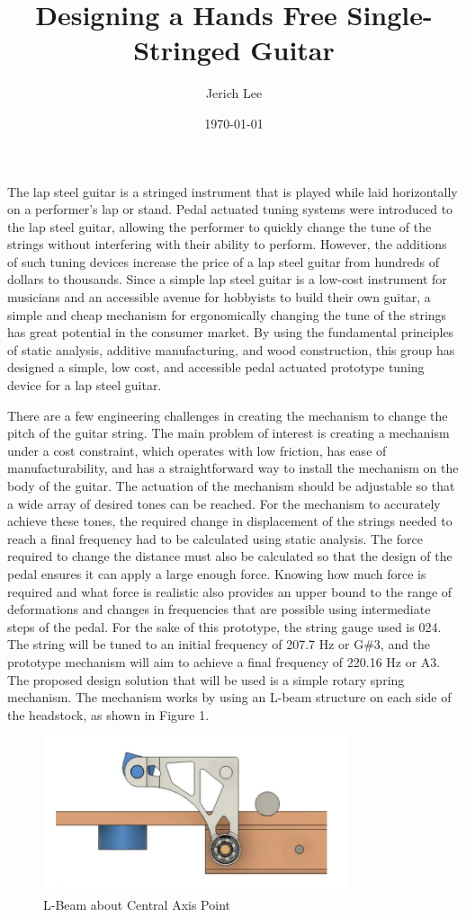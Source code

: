 \documentclass[12pt]{article}
\title{Designing a Hands Free Single-Stringed Guitar}
\author{Jerich Lee}
\date{\today}
\theoremstyle{definition} %
\theoremstyle{plain} %
\begin{document}
\maketitle
The lap steel guitar is a stringed instrument that is played while laid horizontally on a
performer’s lap or stand. Pedal actuated tuning systems were introduced to the lap steel guitar,
allowing the performer to quickly change the tune of the strings without interfering with their ability
to perform. However, the additions of such tuning devices increase the price of a lap steel guitar
from hundreds of dollars to thousands. Since a simple lap steel guitar is a low-cost instrument for
musicians and an accessible avenue for hobbyists to build their own guitar, a simple and cheap
mechanism for ergonomically changing the tune of the strings has great potential in the consumer
market. By using the fundamental principles of static analysis, additive manufacturing, and wood
construction, this group has designed a simple, low cost, and accessible pedal actuated prototype
tuning device for a lap steel guitar.

There are a few engineering challenges in creating the mechanism to change the pitch of the
guitar string. The main problem of interest is creating a mechanism under a cost constraint, which
operates with low friction, has ease of manufacturability, and has a straightforward way to install the
mechanism on the body of the guitar. The actuation of the mechanism should be adjustable so that a
wide array of desired tones can be reached. For the mechanism to accurately achieve these tones, the
required change in displacement of the strings needed to reach a final frequency had to be calculated
using static analysis. The force required to change the distance must also be calculated so that the
design of the pedal ensures it can apply a large enough force. Knowing how much force is required
and what force is realistic also provides an upper bound to the range of deformations and changes in
frequencies that are possible using intermediate steps of the pedal. For the sake of this prototype,
the string gauge used is 024. The string will be tuned to an initial frequency of 207.7 Hz or G\#3, and
the prototype mechanism will aim to achieve a final frequency of 220.16 Hz or A3.
The proposed design solution that will be used is a simple rotary spring mechanism. The
mechanism works by using an L-beam structure on each side of the headstock, as shown in Figure 1.

\begin{figure}[htbp]
  \centering
  \includegraphics[width=0.8\textwidth]{fgs/fig1.png}
  \caption{L-Beam about Central Axis Point}
  \label{fig:}
\end{figure}
\end{document}
